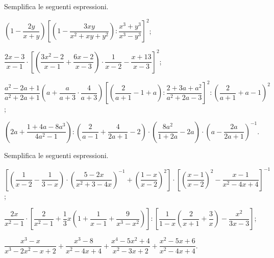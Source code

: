 \begin{esercizio}
Semplifica le seguenti espressioni.
\begin{enumeratea}
 \item $\left(1-\dfrac{2y}{x+y}\right)\left[\left(1-\dfrac{3xy}{x^{2}+xy+y^{2}}\right):\dfrac{x^{3}+y^{3}}{x^{3}-y^{3}}\right]^{2}$;
 \item $\dfrac{2x-3}{x-1}\cdot \left[\left(\dfrac{3x^{2}-2}{x-1}+\dfrac{6x-2}{x-3}\right)\cdot {\dfrac{1}{x-2}}-\dfrac{x+13}{x-3}\right]^{2}$;
 \item $\dfrac{a^{2}-2a+1}{a^{2}+2a+1}\left(a+\dfrac{a}{a+3}\cdot {\dfrac{4}{a+3}}\right)\left[\left(\dfrac{2}{a+1}-1+a\right):\dfrac{2+3a+a^{2}}{a^{2}+2a-3}\right]^{2}:\left(\dfrac{2}{a+1}+a-1\right)^{2}$;
 \item $\left(2a+\dfrac{1+4a-8a^{3}}{4a^{2}-1}\right):\left(\dfrac{2}{a-1}+\dfrac{4}{2a+1}-2\right)\cdot \left(\dfrac{8a^{2}}{1+2a}-2a\right)\cdot \left(a-\dfrac{2a}{2a+1}\right)^{-1}$.
\end{enumeratea}
\end{esercizio}

\begin{esercizio}
Semplifica le seguenti espressioni.
\begin{enumeratea}
 \item $\left[\left(\dfrac{1}{x-2}-\dfrac{1}{3-x}\right)\cdot \left(\dfrac{5-2x}{x^{2}+3-4x}\right)^{-1}+\left(\dfrac{1-x}{x-2}\right)^{2}\right]\cdot \left[\left(\dfrac{x-1}{x-2}\right)^{2}-\dfrac{x-1}{x^{2}-4x+4}\right]^{-1}$;
 \item $\dfrac{2x}{x^{2}-1}\cdot \left[\dfrac{2}{x^{2}-1}+\dfrac{1}{3}x\left(1+\dfrac{1}{x-1}+\dfrac{9}{x^{3}-x^{2}}\right)\right]:\left[\dfrac{1}{1-x}\left(\dfrac{2}{x+1}+\dfrac{3}{x}\right)-\dfrac{x^{2}}{3x-3}\right]$;
 \item $\dfrac{x^{3}-x}{x^{3}-2x^{2}-x+2}+\dfrac{x^{3}-8}{x^{2}-4x+4}+\dfrac{x^{4}-5x^{2}+4}{x^{2}-3x+2}+\dfrac{x^{2}-5x+6}{x^{2}-4x+4}$.
\end{enumeratea}
\end{esercizio}

